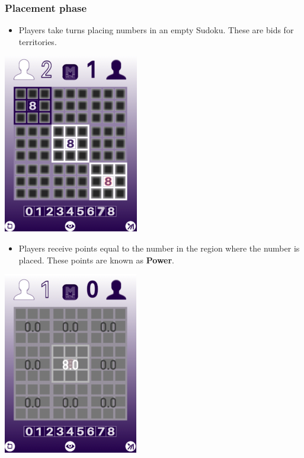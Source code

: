 \documentclass[a4paper]{article}
\begin{document}
\subsubsection{Placement phase}
\begin{itemize}
    \item Players take turns placing numbers in an empty Sudoku. These are bids for territories. 
\end{itemize}
\begin{center}
    \includegraphics[scale=0.5]{img/tutorial_1.png}
\end{center}

\pagebreak
\begin{itemize}
    \item Players receive points equal to the number in the region where the number is placed. These points 
    are known as \textbf{Power}.
\end{itemize}
\begin{center}
    \includegraphics[scale=0.5]{img/tutorial_2.png}
\end{center}
\end{document}
